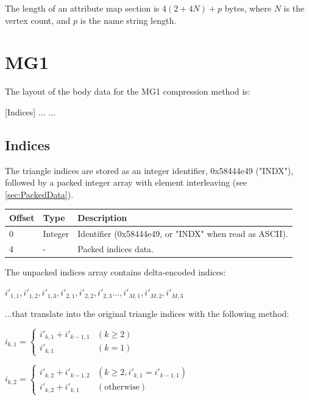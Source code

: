 The length of an attribute map section is $4(2+4N)+p$ bytes, where $N$ is the vertex
count, and $p$ is the name string length.


\section{MG1}
The layout of the body data for the MG1 compression method is:

[Indices]\newline
[Vertices]\newline
[Normals]\newline
[UV map 0]\newline
[UV map 1]\newline
...\newline
[UV map N]\newline
...

\subsection{Indices}
\label{sec:MG1Indices}
The triangle indices are stored as an integer identifier, 0x58444e49 ("INDX"),
followed by a packed integer array with element interleaving (see
\ref{sec:PackedData}).

\begin{tabular}{|l|l|l|}\hline
\textbf{Offset} &  \textbf{Type} & \textbf{Description}\\ \hline
0 & Integer & Identifier (0x58444e49, or "INDX" when read as ASCII).\\ \hline
4 & - & Packed indices data.\\ \hline
\end{tabular}

The unpacked indices array contains delta-encoded indices:

$i'_{1,1}, i'_{1,2}, i'_{1,3}, i'_{2,1}, i'_{2,2}, i'_{2,3} ..., i'_{M,1}, i'_{M,2}, i'_{M,3}$

...that translate into the original triangle indices with the following method:

$i_{k,1} = \begin{cases}
i'_{k,1} + i'_{k-1,1}  & (k \geq 2) \\
i'_{k,1} & (k = 1)
\end{cases}$

$i_{k,2} = \begin{cases}
i'_{k,2} + i'_{k-1,2}  & (k \geq 2, i'_{k,1} = i'_{k-1,1}) \\
i'_{k,2} + i'_{k,1} &  (\text{otherwise})
\end{cases}$

